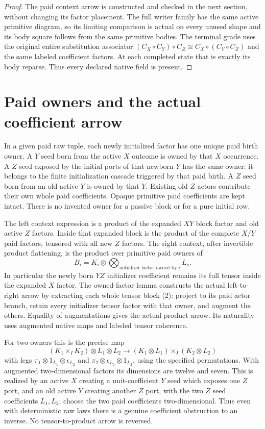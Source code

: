 \documentclass[11pt]{article}
\begin{document}
\begin{proof}
The paid context arrow is constructed and checked in the next section, without changing its factor placement. The full writer family has the same active primitive diagram, so its limiting comparison is actual on every unused shape and its body square follows from the same primitive bodies. The terminal grade uses the original entire substitution associator $(C_X\circ C_Y)\circ C_Z\cong C_X\circ(C_Y\circ C_Z)$ and the same labeled coefficient factors. At each completed state that is exactly its body reparse. Thus every declared native field is present.\end{proof}

\section{Paid owners and the actual coefficient arrow}
In a given paid raw tuple, each newly initialized factor has one unique paid birth owner. A $Y$ seed born from the active $X$ outcome is owned by that $X$ occurrence. A $Z$ seed exposed by the initial ports of that newborn $Y$ has the same owner: it belongs to the finite initialization cascade triggered by that paid birth. A $Z$ seed born from an old active $Y$ is owned by that $Y$. Existing old $Z$ actors contribute their own whole paid coefficients. Opaque primitive paid coefficients are kept intact. There is no invented owner for a passive block or for a pure initial row.

The left context expression is a product of the expanded $XY$ block factor and old active $Z$ factors. Inside that expanded block is the product of the complete $X/Y$ paid factors, tensored with all new $Z$ factors. The right context, after invertible product flattening, is the product over primitive paid owners of
\[
 B_i=K_i\otimes\bigotimes_{\text{initializer factor owned by }i}L_s. \tag{2}
\]
In particular the newly born $YZ$ initializer coefficient remains its full tensor inside the expanded $X$ factor. The owned-factor lemma constructs the actual left-to-right arrow by extracting each whole tensor block (2): project to its paid actor branch, retain every initializer tensor factor with that owner, and augment the others. Equality of augmentations gives the actual product arrow. Its naturality uses augmented native maps and labeled tensor coherence.

For two owners this is the precise map
\[
 (K_1\times_I K_2)\otimes L_1\otimes L_2
 \longrightarrow (K_1\otimes L_1)\times_I(K_2\otimes L_2)
\]
with legs $\pi_1\otimes1_{L_1}\otimes\epsilon_{L_2}$ and $\pi_2\otimes\epsilon_{L_1}\otimes1_{L_2}$, using the specified permutations. With augmented two-dimensional factors its dimensions are twelve and seven. This is realized by an active $X$ creating a unit-coefficient $Y$ seed which exposes one $Z$ port, and an old active $Y$ creating another $Z$ port, with the two $Z$ seed coefficients $L_1,L_2$; choose the two paid coefficients two-dimensional. Thus even with deterministic raw laws there is a genuine coefficient obstruction to an inverse. No tensor-to-product arrow is reversed.
\end{document}
